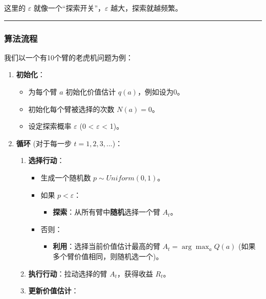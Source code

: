 \documentclass[11pt]{ctexart}
\providecommand{\tightlist}{%
      \setlength{\itemsep}{0pt}\setlength{\parskip}{0pt}}
\begin{document}
这里的 \(\varepsilon\) 就像一个``探索开关''，\(\varepsilon\)
越大，探索就越频繁。

\begin{center}\rule{0.5\linewidth}{0.5pt}\end{center}

\hypertarget{ux7b97ux6cd5ux6d41ux7a0b}{%
\subsubsection{算法流程}\label{ux7b97ux6cd5ux6d41ux7a0b}}

我们以一个有10个臂的老虎机问题为例：

\begin{enumerate}
\def\labelenumi{\arabic{enumi}.}
\tightlist
\item
  \textbf{初始化}：

  \begin{itemize}
  \tightlist
  \item
    为每个臂 \(a\) 初始化价值估计 \(q(a)\)，例如设为0。
  \item
    初始化每个臂被选择的次数 \(N(a) = 0\)。
  \item
    设定探索概率 \(\varepsilon\) (0 \textless{} \(\varepsilon\)
    \textless{} 1)。
  \end{itemize}
\item
  \textbf{循环} (对于每一步 \(t=1, 2, 3, ...\))：

  \begin{enumerate}
  \def\labelenumii{\alph{enumii}.}
  \item
    \textbf{选择行动}：

    \begin{itemize}
    \tightlist
    \item
      生成一个随机数 \(p \sim Uniform(0,1)\)。
    \item
      如果 \(p < \varepsilon\)：

      \begin{itemize}
      \tightlist
      \item
        \textbf{探索}：从所有臂中\textbf{随机}选择一个臂 \(A_t\)。
      \end{itemize}
    \item
      否则：

      \begin{itemize}
      \tightlist
      \item
        \textbf{利用}：选择当前价值估计最高的臂
        \(A_t = \arg\max_a Q(a)\) (如果多个臂价值相同，则随机选一个)。
      \end{itemize}
    \end{itemize}
  \item
    \textbf{执行行动}：拉动选择的臂 \(A_t\)，获得收益 \(R_t\)。
  \item
    \textbf{更新价值估计}：


\end{enumerate}
\end{enumerate}
\end{document}
